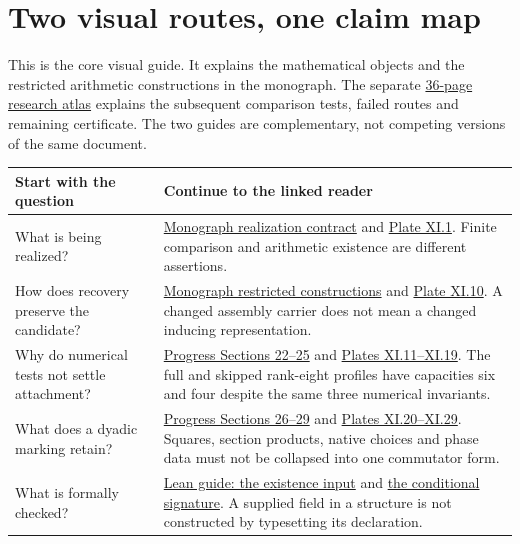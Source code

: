 \section*{Two visual routes, one claim map}
{}
This is the core visual guide. It explains the mathematical objects and the restricted arithmetic constructions in the monograph. The separate \href{https://komorebi.invalid/b07/visual_atlas}{36-page research atlas} explains the subsequent comparison tests, failed routes and remaining certificate. The two guides are complementary, not competing versions of the same document.

\begin{tabular}{@{}>{\raggedright\arraybackslash}p{.28\linewidth}>{\raggedright\arraybackslash}p{.67\linewidth}@{}}\toprule
Start with the question & Continue to the linked reader\\\midrule
What is being realized? & \href{https://komorebi.invalid/b07/visual_contract}{Monograph realization contract} and \href{https://komorebi.invalid/b07/visual_v01}{Plate XI.1}. Finite comparison and arithmetic existence are different assertions.\\[9pt]
How does recovery preserve the candidate? & \href{https://komorebi.invalid/b07/visual_recovery}{Monograph restricted constructions} and \href{https://komorebi.invalid/b07/visual_v10}{Plate XI.10}. A changed assembly carrier does not mean a changed inducing representation.\\[9pt]
Why do numerical tests not settle attachment? & \href{https://komorebi.invalid/b07/visual_conductors}{Progress Sections 22--25} and \href{https://komorebi.invalid/b07/visual_v15}{Plates XI.11--XI.19}. The full and skipped rank-eight profiles have capacities six and four despite the same three numerical invariants.\\[9pt]
What does a dyadic marking retain? & \href{https://komorebi.invalid/b07/visual_marks}{Progress Sections 26--29} and \href{https://komorebi.invalid/b07/visual_v20}{Plates XI.20--XI.29}. Squares, section products, native choices and phase data must not be collapsed into one commutator form.\\[9pt]
What is formally checked? & \href{https://komorebi.invalid/b07/visual_lean_input}{Lean guide: the existence input} and \href{https://komorebi.invalid/b07/visual_lean_signature}{the conditional signature}. A supplied field in a structure is not constructed by typesetting its declaration.\\\bottomrule
\end{tabular}

